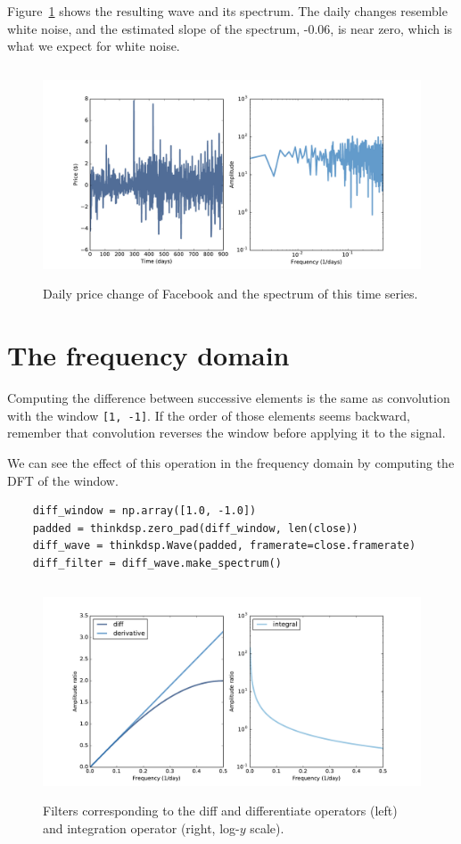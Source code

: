 \documentclass[12pt]{book}
\begin{document}
Figure~\ref{fig.diff_int2} shows the resulting wave and its spectrum.
The daily changes resemble white noise, and the estimated slope of the
spectrum, -0.06, is near zero, which is what we expect for white
noise.

\begin{figure}
\centerline{\includegraphics[height=2.5in]{figs/diff_int2.pdf}}
\caption{Daily price change of Facebook and the spectrum of this time series.}
\label{fig.diff_int2}
\end{figure}


\section{The frequency domain}

Computing the difference
between successive elements is the same as convolution with
the window {\tt [1, -1]}.
If the order of those elements seems backward,
remember that convolution reverses the window before applying it
to the signal.

We can see the effect of this operation in the frequency domain
by computing the DFT of the window.

\begin{verbatim}
    diff_window = np.array([1.0, -1.0])
    padded = thinkdsp.zero_pad(diff_window, len(close))
    diff_wave = thinkdsp.Wave(padded, framerate=close.framerate)
    diff_filter = diff_wave.make_spectrum()
\end{verbatim}

\begin{figure}
\centerline{\includegraphics[height=2.5in]{figs/diff_int3.pdf}}
\caption{Filters corresponding to the diff and differentiate operators (left) and integration operator (right, log-$y$ scale).}
\label{fig.diff_int3}
\end{figure}
\end{document}
